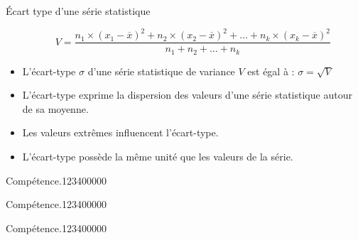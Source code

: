 \begin{pageCours}
\begin{DefT}{Écart type d'une série statistique}
\begin{itemize}
\[V=\frac{n_1\times (x_1-\overline{x})^2+n_2\times (x_2-\overline{x})^2+\ldots+n_k\times (x_k-\overline{x})^2}{n_1+n_2+\ldots+n_k}\]

\item L'écart-type $\sigma$
d'une série statistique de variance $V$ est égal à : $\sigma=\sqrt{V}$
\end{itemize}

\end{DefT}

\begin{Rqs}
\begin{itemize}
\item L'écart-type exprime la dispersion des valeurs d'une série statistique autour de sa moyenne.
\item Les valeurs extrêmes influencent l'écart-type.
\item L'écart-type possède la même unité que les valeurs de la série.
\end{itemize}
\end{Rqs}

\end{pageCours} %


\begin{pageAD}  %
\restoregeometry %


\begin{ExoCad}{Compétence.}{1234}{0}{0}{0}{0}{0}

\end{ExoCad}


\begin{ExoCad}{Compétence.}{1234}{0}{0}{0}{0}{0}

\end{ExoCad}


\begin{ExoCad}{Compétence.}{1234}{0}{0}{0}{0}{0}

\end{ExoCad}
 
\end{pageAD} %


